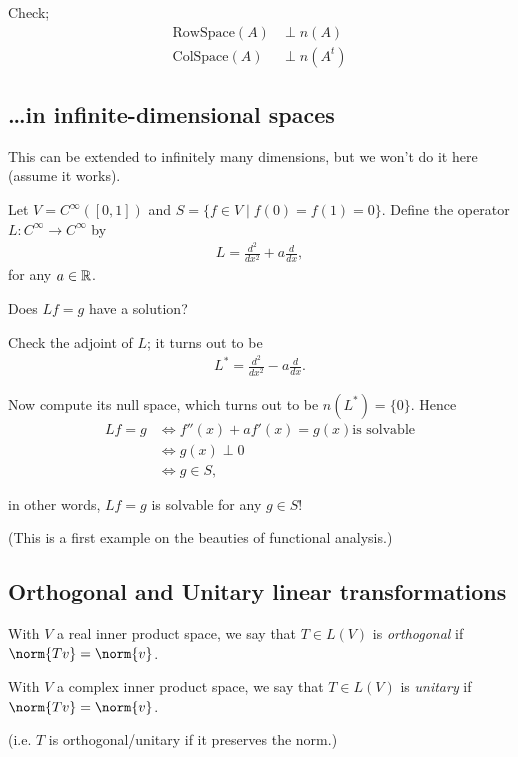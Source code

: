 Check;
\begin{align*}
  \text{RowSpace}(A) &\perp n(A)\\
  \text{ColSpace}(A) &\perp n(A^t)
\end{align*}

\subsection{\dots in infinite-dimensional spaces}
This can be extended to infinitely many dimensions, but we won't do it here (assume it works).

Let $V=C^\infty([0,1])$ and $S=\{f\in V \mid f(0)=f(1)=0\}$. Define the operator $L:C^\infty\to C^\infty$ by
\begin{align*}
  L = \frac{d^2}{dx^2} + a\frac{d}{dx},
\end{align*}
for any $a\in\mathbb{R}$.

\begin{question}
  Does $Lf=g$ have a solution?
\end{question}
\begin{answer}
  Check the adjoint of $L$; it turns out to be
  \begin{align*}
    L^* = \frac{d^2}{dx^2} - a\frac{d}{dx}.
  \end{align*}

  Now compute its null space, which turns out to be $n(L^*)=\{0\}$. Hence
  \begin{align*}
    Lf=g &\Longleftrightarrow f''(x)+af'(x) = g(x) \text{is solvable}\\
    &\Longleftrightarrow g(x) \perp 0\\
    &\Longleftrightarrow g\in S,
  \end{align*}

  in other words, $Lf=g$ is solvable for any $g\in S$!

  (This is a first example on the beauties of functional analysis.)
\end{answer}



\subsection{Orthogonal and Unitary linear transformations}

\begin{definition}
  With $V$ a real inner product space, we say that $T\in L(V)$ is \emph{orthogonal} if $\norm{Tv}=\norm{v}$.

  With $V$ a complex inner product space, we say that $T\in L(V)$ is \emph{unitary} if $\norm{Tv}=\norm{v}$.

  (i.e. $T$ is orthogonal/unitary if it preserves the norm.)
\end{definition}

